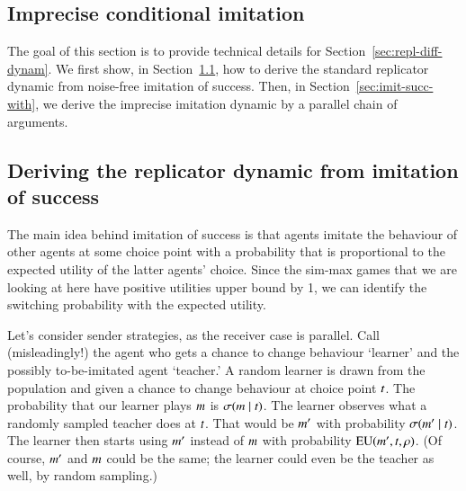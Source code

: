 \documentclass[11pt,english]{article}
\numberwithin{equation}{section}
\begin{document}
\begin{appendices}

\section{Imprecise conditional imitation}
\label{sec:formal-stuff}

The goal of this section is to provide technical details for
Section~\ref{sec:repl-diff-dynam}. We first show, in Section~\ref{sec:cond-imit-succ}, how to
derive the standard replicator dynamic from noise-free imitation of success. Then, in
Section~\ref{sec:imit-succ-with}, we derive the imprecise imitation dynamic by a parallel
chain of arguments.


\subsection{Deriving the replicator dynamic from imitation of success}
\label{sec:cond-imit-succ}

The main idea behind imitation of success is that agents imitate the behaviour of other
agents at some choice point with a probability that is proportional to the expected utility of
the latter agents' choice. Since the sim-max games that we are looking at here have positive
utilities upper bound by 1, we can identify the switching probability with the expected
utility.

Let's consider sender strategies, as the receiver case is parallel. Call (misleadingly!) the
agent who gets a chance to change behaviour `learner' and the possibly to-be-imitated agent
`teacher.' A random learner is drawn from the population and given a chance to change
behaviour at choice point $t$. The probability that our learner plays $m$ is
$\sigma(m \mid t)$. The learner observes what a randomly sampled teacher does at
$t$. That would be $m'$ with probability $\sigma(m' \mid t)$. The
learner then starts using $m'$ instead of $m$ with probability
$\mathrm{EU}(m', t, \rho)$. (Of course, $m'$ and $m$ could be the same; the
learner could even be the teacher as well, by random sampling.)


\end{appendices}
\end{document}
